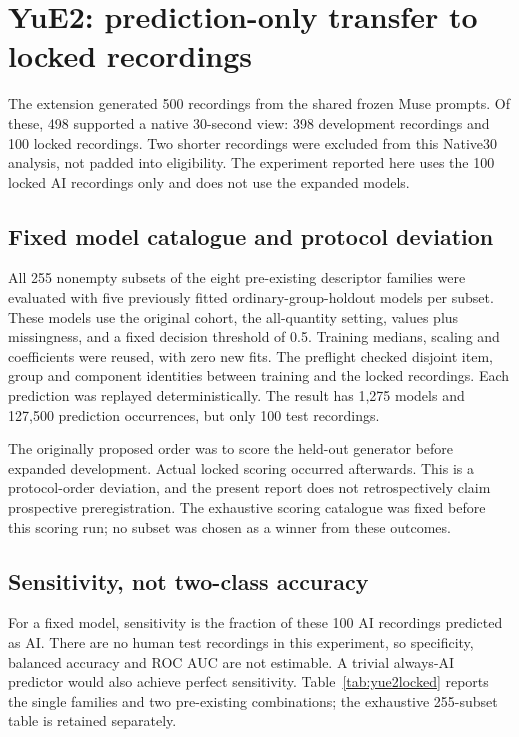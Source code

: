\section{YuE2: prediction-only transfer to locked recordings}
\label{sec:yue2locked}

The extension generated 500 recordings from the shared frozen Muse prompts.
Of these, 498 supported a native 30-second view: 398 development recordings
and 100 locked recordings. Two shorter recordings were excluded from this
Native30 analysis, not padded into eligibility. The experiment reported here
uses the 100 locked AI recordings only and does not use the expanded models.

\subsection{Fixed model catalogue and protocol deviation}
All 255 nonempty subsets of the eight pre-existing descriptor families were
evaluated with five previously fitted ordinary-group-holdout models per subset.
These models use the original cohort, the all-quantity setting, values plus
missingness, and a fixed decision threshold of 0.5. Training medians, scaling
and coefficients were reused, with zero new fits. The preflight checked
disjoint item, group and component identities between training and the locked
recordings. Each prediction was replayed deterministically. The result has
1,275 models and 127,500 prediction occurrences, but only 100 test recordings.

The originally proposed order was to score the held-out generator before
expanded development. Actual locked scoring occurred afterwards. This is a
protocol-order deviation, and the present report does not retrospectively
claim prospective preregistration. The exhaustive scoring catalogue was fixed
before this scoring run; no subset was chosen as a winner from these outcomes.

\subsection{Sensitivity, not two-class accuracy}
For a fixed model, sensitivity is the fraction of these 100 AI recordings
predicted as AI. There are no human test recordings in this experiment, so
specificity, balanced accuracy and ROC AUC are not estimable. A trivial
always-AI predictor would also achieve perfect sensitivity.
Table~\ref{tab:yue2locked} reports the single families and two pre-existing
combinations; the exhaustive 255-subset table is retained separately.

